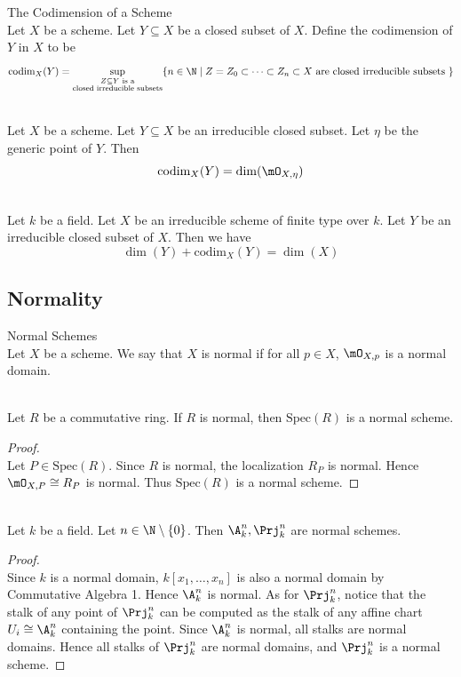 \documentclass[a4paper]{article}
\begin{document}
\begin{defn}{The Codimension of a Scheme}{}\\
Let $X$ be a scheme. Let $Y\subseteq X$ be a closed subset of $X$. Define the codimension of $Y$ in $X$ to be $$\text{codim}_X(Y)=\sup_{\substack{Z\subseteq Y\text{ is a}\\\text{closed irreducible subsets}}}\{n\in\N\;|\;Z=Z_0\subset\cdots\subset Z_n\subset X\text{ are closed irreducible subsets }\}$$
\end{defn}

\begin{prp}{}{}\\
Let $X$ be a scheme. Let $Y\subseteq X$ be an irreducible closed subset. Let $\eta$ be the generic point of $Y$. Then $$\text{codim}_X(Y)=\dim(\mO_{X,\eta})$$
\end{prp}

\begin{prp}{}{}\\
Let $k$ be a field. Let $X$ be an irreducible scheme of finite type over $k$. Let $Y$ be an irreducible closed subset of $X$. Then we have $$\dim(Y)+\text{codim}_X(Y)=\dim(X)$$
\end{prp}

\subsection{Normality}
\begin{defn}{Normal Schemes}{}\\
Let $X$ be a scheme. We say that $X$ is normal if for all $p\in X$, $\mO_{X,p}$ is a normal domain. 
\end{defn}

\begin{lmm}{}{}\\
Let $R$ be a commutative ring. If $R$ is normal, then $\text{Spec}(R)$ is a normal scheme. 
\begin{proof}\\
Let $P\in\text{Spec}(R)$. Since $R$ is normal, the localization $R_P$ is normal. Hence $\mO_{X,P}\cong R_P$ is normal. Thus $\text{Spec}(R)$ is a normal scheme. 
\end{proof}
\end{lmm}

\begin{eg}{}{}\\
Let $k$ be a field. Let $n\in\N\setminus\{0\}$. Then $\A_k^n,\Prj_k^n$ are normal schemes. 
\begin{proof}\\
Since $k$ is a normal domain, $k[x_1,\dots,x_n]$ is also a normal domain by Commutative Algebra 1. Hence $\A_k^n$ is normal. As for $\Prj_k^n$, notice that the stalk of any point of $\Prj_k^n$ can be computed as the stalk of any affine chart $U_i\cong\A_k^n$ containing the point. Since $\A_k^n$ is normal, all stalks are normal domains. Hence all stalks of $\Prj_k^n$ are normal domains, and $\Prj_k^n$ is a normal scheme. 
\end{proof}
\end{eg}
\end{document}
